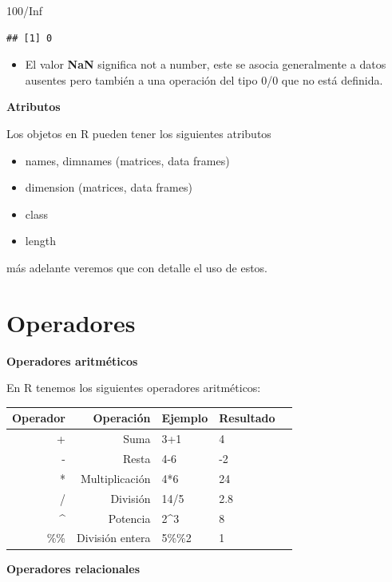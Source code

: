 \documentclass[
  12pt,
]{book}
\newenvironment{Shaded}{\begin{snugshade}}{\end{snugshade}}
\newcommand{\ConstantTok}[1]{\textcolor[rgb]{0.00,0.00,0.00}{#1}}
\newcommand{\DecValTok}[1]{\textcolor[rgb]{0.00,0.00,0.81}{#1}}
\newcommand{\SpecialCharTok}[1]{\textcolor[rgb]{0.00,0.00,0.00}{#1}}
\providecommand{\tightlist}{%
  \setlength{\itemsep}{0pt}\setlength{\parskip}{0pt}}
\begin{document}
\begin{Shaded}
\begin{Highlighting}[]
\DecValTok{100}\SpecialCharTok{/}\ConstantTok{Inf}
\end{Highlighting}
\end{Shaded}

\begin{verbatim}
## [1] 0
\end{verbatim}

\begin{itemize}
\tightlist
\item
  El valor \textbf{NaN} significa not a number, este se asocia generalmente a datos ausentes pero también a una operación del tipo 0/0 que no está definida.
\end{itemize}

\textbf{Atributos}

Los objetos en R pueden tener los siguientes atributos

\begin{itemize}
\tightlist
\item
  names, dimnames (matrices, data frames)
\item
  dimension (matrices, data frames)
\item
  class
\item
  length
\end{itemize}

más adelante veremos que con detalle el uso de estos.

\hypertarget{operadores}{%
\chapter{\texorpdfstring{\textbf{Operadores}}{Operadores}}\label{operadores}}

\textbf{Operadores aritméticos}

En R tenemos los siguientes operadores aritméticos:

\begin{longtable}[]{@{}rrlll@{}}
\toprule
Operador & Operación & Ejemplo & Resultado &\tabularnewline
\midrule
\endhead
+ & Suma & 3+1 & 4 &\tabularnewline
- & Resta & 4-6 & -2 &\tabularnewline
* & Multiplicación & 4*6 & 24 &\tabularnewline
/ & División & 14/5 & 2.8 &\tabularnewline
\^{} & Potencia & 2\^{}3 & 8 &\tabularnewline
\%\% & División entera & 5\%\%2 & 1 &\tabularnewline
\bottomrule
\end{longtable}

\textbf{Operadores relacionales}
\end{document}
